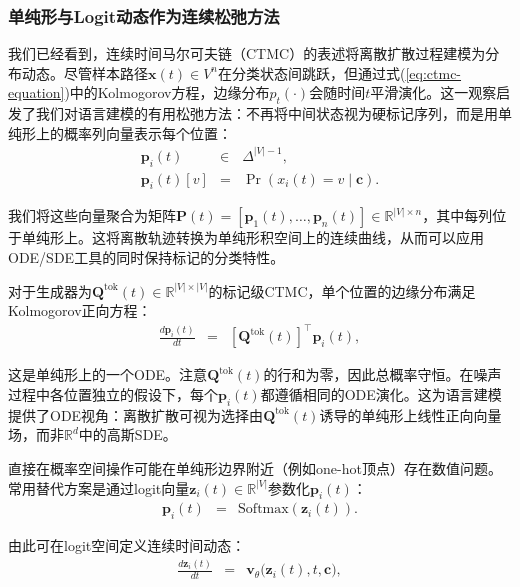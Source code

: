 \documentclass[UTF8,a4paper,zihao=-4,oneside,openany]{ctexbook}
\begin{document}
\subsubsection{单纯形与Logit动态作为连续松弛方法}

我们已经看到，连续时间马尔可夫链（CTMC）的表述将离散扩散过程建模为分布动态。尽管样本路径$\mathbf{x}(t)\in V^n$在分类状态间跳跃，但通过式(\ref{eq:ctmc-equation})中的Kolmogorov方程，边缘分布$p_t(\cdot)$会随时间$t$平滑演化。这一观察启发了我们对语言建模的有用松弛方法：不再将中间状态视为硬标记序列，而是用单纯形上的概率列向量表示每个位置：
\begin{eqnarray}
\mathbf{p}_i(t) & \in & \Delta^{|V|-1}, \\
\mathbf{p}_i(t)[v] & = & \Pr(x_i(t)=v \mid \mathbf{c}).
\end{eqnarray}

\noindent 我们将这些向量聚合为矩阵$\mathbf{P}(t) = [\mathbf{p}_1(t), \dots, \mathbf{p}_n(t)] \in \mathbb{R}^{|V| \times n}$，其中每列位于单纯形上。这将离散轨迹转换为单纯形积空间上的连续曲线，从而可以应用ODE/SDE工具的同时保持标记的分类特性。

对于生成器为$\mathbf{Q}^{\mathrm{tok}}(t) \in \mathbb{R}^{|V| \times |V|}$的标记级CTMC，单个位置的边缘分布满足Kolmogorov正向方程：
\begin{eqnarray}
\frac{d \mathbf{p}_i(t)}{dt} & = & \left[ \mathbf{Q}^{\mathrm{tok}}(t) \right]^\top \mathbf{p}_i(t),
\label{eq:simplex-forward-ode}
\end{eqnarray}

\noindent 这是单纯形上的一个ODE。注意$\mathbf{Q}^{\mathrm{tok}}(t)$的行和为零，因此总概率守恒。在噪声过程中各位置独立的假设下，每个$\mathbf{p}_i(t)$都遵循相同的ODE演化。这为语言建模提供了ODE视角：离散扩散可视为选择由$\mathbf{Q}^{\mathrm{tok}}(t)$诱导的单纯形上线性正向向量场，而非$\mathbb{R}^d$中的高斯SDE。

直接在概率空间操作可能在单纯形边界附近（例如one-hot顶点）存在数值问题。常用替代方案是通过logit向量$\mathbf{z}_i(t)\in\mathbb{R}^{|V|}$参数化$\mathbf{p}_i(t)$：
\begin{eqnarray}
\mathbf{p}_i(t) & = &\mathrm{Softmax}(\mathbf{z}_i(t)).
\end{eqnarray}

\noindent 由此可在logit空间定义连续时间动态：
\begin{eqnarray}
\frac{d \mathbf{z}_i(t)}{dt} & = & \mathbf{v}_{\theta} \big(\mathbf{z}_i(t),t,\mathbf{c}\big),
\label{eq:logit-ode}
\end{eqnarray}
\end{document}
